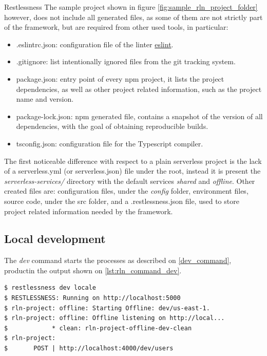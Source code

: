 \begin{chapter}{Restlessness}
    The sample project shown in figure \ref{fig:sample_rln_project_folder} however,
    does not include all generated files, as some of them are not strictly part of
    the framework, but are required from other used tools, in particular:
    \begin{itemize}
        \item .eslintrc.json: configuration file of the linter
            \href{https://eslint.org/}{eslint}.
        \item .gitignore: list intentionally ignored files from the git tracking
            system.
        \item package.json: entry point of every npm project, it lists the project
            dependencies, as well as other project related information, such as
            the project name and version.
        \item package-lock.json: npm generated file, contains a snapshot of the
            version of all dependencies, with the goal of obtaining reproducible
            builds.
        \item tsconfig.json: configuration file for the Typescript compiler.
    \end{itemize}

    The first noticeable difference with respect to a plain serverless project is the
    lack of a serverless.yml (or serverless.json) file under the root, instead it
    is present the \textit{serverless-services/} directory with the default services
    \textit{shared} and \textit{offline}.
    Other created files are: configuration files, under the \textit{config} folder,
    environment files, source code, under the src folder, and a .restlessness.json
    file, used to store project related information needed by the framework.

    \subsection{Local development}
    \label{sec:local_dev}

    The \textit{dev} command starts the processes as described on \ref{dev_command},
    productin the output shown on \ref{lst:rln_command_dev}.

    \bigskip
    \begin{lstlisting}[caption=Dev command, label={lst:rln_command_dev}]
$ restlessness dev locale
$ RESTLESSNESS: Running on http://localhost:5000
$ rln-project: offline: Starting Offline: dev/us-east-1.
$ rln-project: offline: Offline listening on http://local...
$            * clean: rln-project-offline-dev-clean
$ rln-project:
$       POST | http://localhost:4000/dev/users
    \end{lstlisting}


\end{chapter}
